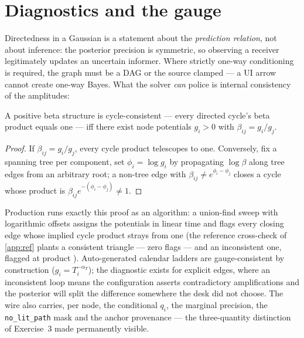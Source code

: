 \documentclass[11pt]{article}
\begin{document}
\section{Diagnostics and the gauge}
\label{sec:diagnostics}

Directedness in a Gaussian is a statement about the \emph{prediction
relation}, not about inference: the posterior precision is symmetric,
so observing a receiver legitimately updates an uncertain informer.
Where strictly one-way conditioning is required, the graph must be a
DAG or the source clamped --- a UI arrow cannot create one-way Bayes.
What the solver \emph{can} police is internal consistency of the
amplitudes:

\begin{proposition}
\label{prop:gauge}
A positive beta structure is cycle-consistent --- every directed
cycle's beta product equals one --- iff there exist node potentials
$g_i>0$ with $\beta_{ij}=g_i/g_j$.
\end{proposition}

\begin{proof}
If $\beta_{ij}=g_i/g_j$, every cycle product telescopes to one.
Conversely, fix a spanning tree per component, set $\phi_i=\log g_i$
by propagating $\log\beta$ along tree edges from an arbitrary root; a
non-tree edge with $\beta_{ij}\ne e^{\phi_i-\phi_j}$ closes a cycle
whose product is $\beta_{ij}e^{-(\phi_i-\phi_j)}\ne1$.
\end{proof}

Production runs exactly this proof as an algorithm: a union-find sweep
with logarithmic offsets assigns the potentials in linear time and
flags every closing edge whose implied cycle product strays from one
(the reference cross-check of \cref{app:ref} plants a consistent
triangle --- zero flags --- and an inconsistent one, flagged at product
\gmcyclebad).  Auto-generated calendar ladders are gauge-consistent by
construction ($g_i=T_i^{-\alpha_T}$); the diagnostic exists for
explicit edges, where an inconsistent loop means the configuration
asserts contradictory amplifications and the posterior will split the
difference somewhere the desk did not choose.  The wire also carries,
per node, the conditional $q_i$, the marginal precision, the
\texttt{no\_lit\_path} mask and the anchor provenance --- the
three-quantity distinction of Exercise~3 made permanently visible.

\end{document}
